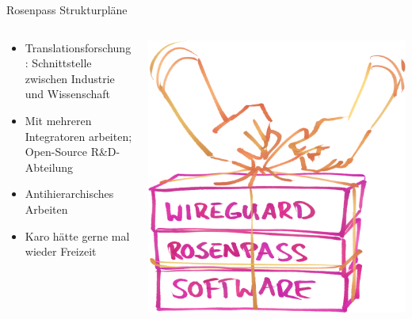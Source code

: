 \documentclass[german]{rosenpass-beamer}
\begin{document}
\begin{frame}{Rosenpass Strukturpläne}
\begin{columns}[c]
\begin{column}{0.7\textwidth}
\begin{itemize}
  \item Translationsforschung: Schnittstelle zwischen Industrie und Wissenschaft
  \item Mit mehreren Integratoren arbeiten; Open-Source R\&D-Abteilung
  \item Antihierarchisches Arbeiten
  \item Karo hätte gerne mal wieder Freizeit
\end{itemize}
\end{column}

\begin{column}{0.2\textwidth}
\includegraphics[width=\linewidth]{graphics/rosenpass in anderen apps.png}


\end{column}
\end{columns}
\end{frame}
\end{document}
